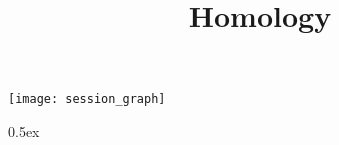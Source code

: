 \documentclass[11pt,a4paper]{book}
\begin{document}
\title{Homology}
\maketitle

\tableofcontents

\begin{center}
  \texttt{[image: session\_graph]}
\end{center}

\newpage

\renewcommand{\setisabellecontext}[1]{\markright{\href{#1.html}{#1.thy}}}

\parindent 0pt\parskip 0.5ex


\pagestyle{headings}

\end{document}
